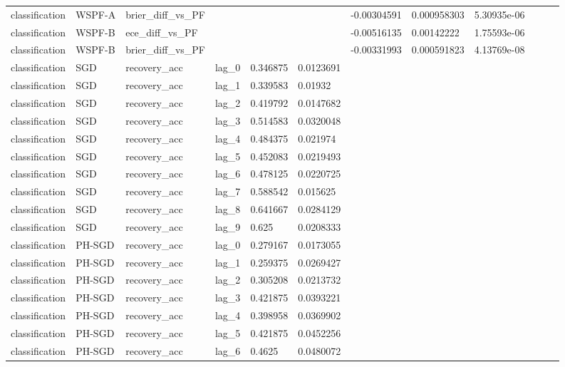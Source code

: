 \begin{tabular}{llllllllllll}
classification & WSPF-A & brier\_diff\_vs\_PF &  &  &  & -0.00304591 & 0.000958303 & 5.30935e-06 &  &  &  \\
classification & WSPF-B & ece\_diff\_vs\_PF &  &  &  & -0.00516135 & 0.00142222 & 1.75593e-06 &  &  &  \\
classification & WSPF-B & brier\_diff\_vs\_PF &  &  &  & -0.00331993 & 0.000591823 & 4.13769e-08 &  &  &  \\
classification & SGD & recovery\_acc & lag\_0 & 0.346875 & 0.0123691 &  &  &  &  &  &  \\
classification & SGD & recovery\_acc & lag\_1 & 0.339583 & 0.01932 &  &  &  &  &  &  \\
classification & SGD & recovery\_acc & lag\_2 & 0.419792 & 0.0147682 &  &  &  &  &  &  \\
classification & SGD & recovery\_acc & lag\_3 & 0.514583 & 0.0320048 &  &  &  &  &  &  \\
classification & SGD & recovery\_acc & lag\_4 & 0.484375 & 0.021974 &  &  &  &  &  &  \\
classification & SGD & recovery\_acc & lag\_5 & 0.452083 & 0.0219493 &  &  &  &  &  &  \\
classification & SGD & recovery\_acc & lag\_6 & 0.478125 & 0.0220725 &  &  &  &  &  &  \\
classification & SGD & recovery\_acc & lag\_7 & 0.588542 & 0.015625 &  &  &  &  &  &  \\
classification & SGD & recovery\_acc & lag\_8 & 0.641667 & 0.0284129 &  &  &  &  &  &  \\
classification & SGD & recovery\_acc & lag\_9 & 0.625 & 0.0208333 &  &  &  &  &  &  \\
classification & PH-SGD & recovery\_acc & lag\_0 & 0.279167 & 0.0173055 &  &  &  &  &  &  \\
classification & PH-SGD & recovery\_acc & lag\_1 & 0.259375 & 0.0269427 &  &  &  &  &  &  \\
classification & PH-SGD & recovery\_acc & lag\_2 & 0.305208 & 0.0213732 &  &  &  &  &  &  \\
classification & PH-SGD & recovery\_acc & lag\_3 & 0.421875 & 0.0393221 &  &  &  &  &  &  \\
classification & PH-SGD & recovery\_acc & lag\_4 & 0.398958 & 0.0369902 &  &  &  &  &  &  \\
classification & PH-SGD & recovery\_acc & lag\_5 & 0.421875 & 0.0452256 &  &  &  &  &  &  \\
classification & PH-SGD & recovery\_acc & lag\_6 & 0.4625 & 0.0480072 &  &  &  &  &  &  \\

\end{tabular}
